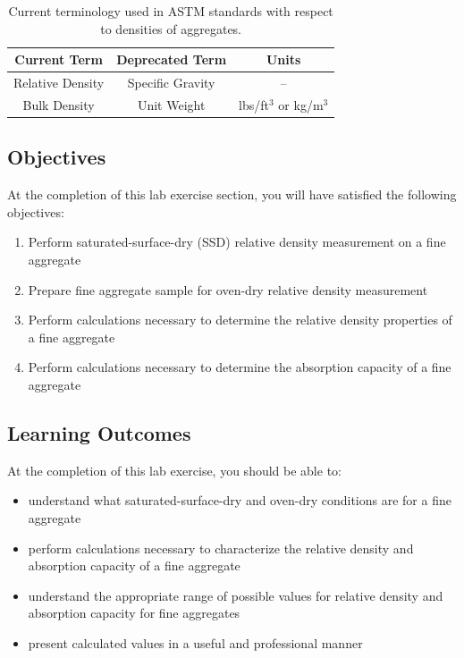 \documentclass[12pt]{article}
\begin{document}
\begin{table}[h]
\centering
\caption{Current terminology used in ASTM standards with respect to densities of aggregates.}
\label{tab:ASTMname}
\begin{tabular}{ccc}
\hline
Current Term & Deprecated Term & Units \\ \hline
Relative Density & Specific Gravity & -- \\
Bulk Density & Unit Weight & lbs/ft$^3$ or kg/m$^3$ \\ \hline
\end{tabular}
\end{table}

\newpage
\subsection{Objectives}
\label{ssec:headingscap}
At the completion of this lab exercise section, you will have satisfied the following objectives:
\begin{enumerate}
    \item Perform saturated-surface-dry (SSD) relative density measurement on a fine aggregate
    \item Prepare fine aggregate sample for oven-dry relative density measurement
    \item Perform calculations necessary to determine the relative density properties of a fine aggregate
    \item Perform calculations necessary to determine the absorption capacity of a fine aggregate
\end{enumerate}

\subsection{Learning Outcomes}
At the completion of this lab exercise, you should be able to:
\begin{itemize}
    \item understand what saturated-surface-dry and oven-dry conditions are for a fine aggregate
    \item perform calculations necessary to characterize the relative density and absorption capacity of a fine aggregate
    \item understand the appropriate range of possible values for relative density and absorption capacity for fine aggregates
    \item present calculated values in a useful and professional manner
\end{itemize}
\end{document}
